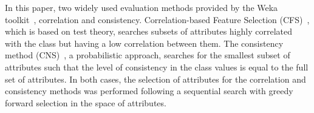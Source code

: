 \documentclass{elsart}
\begin{document}
In this paper, two widely used evaluation methods provided by the Weka toolkit~\cite{WF05}, correlation and consistency. Correlation-based Feature Selection (CFS)~\cite{Hall99CFSThesis}, which is based on test theory, searches subsets of attributes highly correlated with the class but having a low correlation between them. The consistency method (CNS)~\cite{DLM00}, a probabilistic approach, searches for the smallest subset of attributes such that the level of consistency in the class values is equal to the full set of attributes. In both cases, the selection of attributes for the correlation and consistency methods was performed following a sequential search with greedy forward selection in the space of attributes.

%
%
\end{document}
